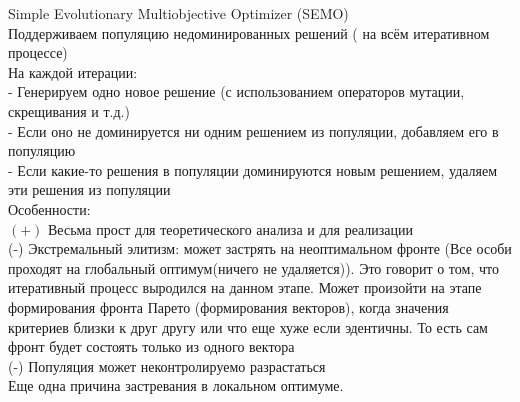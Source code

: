 \newpage
Simple Evolutionary Multiobjective Optimizer (SEMO)\\
Поддерживаем популяцию недоминированных решений ( на всём итеративном процессе)\\
На каждой итерации:\\
- Генерируем одно новое решение (с использованием операторов
мутации, скрещивания и т.д.)\\
- Если оно не доминируется ни одним решением из популяции,
добавляем его в популяцию\\
- Если какие-то решения в популяции доминируются новым решением,
удаляем эти решения из популяции\\

Особенности:\\
$(+)$ Весьма прост для теоретического анализа и для реализации\\
(-) Экстремальный элитизм: может застрять на неоптимальном фронте (Все особи проходят на глобальный оптимум(ничего не удаляется)). Это говорит о том, что итеративный процесс выродился на данном этапе. Может произойти на этапе формирования фронта Парето (формирования векторов), когда значения критериев близки к друг другу или что еще хуже если эдентичны. То есть сам фронт будет состоять только из одного вектора\\
(-) Популяция может неконтролируемо разрастаться\\
Еще одна причина застревания в локальном оптимуме.


